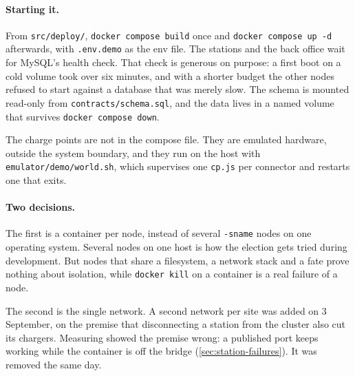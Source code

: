 \paragraph{Starting it.} From \texttt{src/deploy/}, \texttt{docker compose build} once and
\texttt{docker compose up -d} afterwards, with \texttt{.env.demo} as the env file. The
stations and the back office wait for MySQL's health check. That check is generous on
purpose: a first boot on a cold volume took over six minutes, and with a shorter budget the
other nodes refused to start against a database that was merely slow. The schema is mounted
read-only from \texttt{contracts/schema.sql}, and the data lives in a named volume that
survives \texttt{docker compose down}.

The charge points are not in the compose file. They are emulated hardware, outside the
system boundary, and they run on the host with \texttt{emulator/demo/world.sh}, which
supervises one \texttt{cp.js} per connector and restarts one that exits.

\paragraph{Two decisions.} The first is a container per node, instead of several
\texttt{-sname} nodes on one operating system. Several nodes on one host is how the election
gets tried during development. But nodes that share a filesystem, a network stack and a fate
prove nothing about isolation, while \texttt{docker kill} on a container is a real failure
of a node.

The second is the single network. A second network per site was added on 3 September, on the
premise that disconnecting a station from the cluster also cut its chargers. Measuring showed
the premise wrong: a published port keeps working while the container is off the bridge
(\cref{sec:station-failures}). It was removed the same day.
